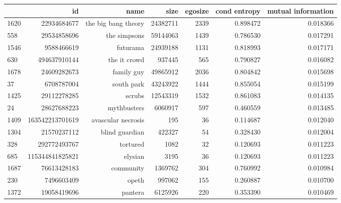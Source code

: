 \begin{table}
\begin{tabular}{| >{\small}l | >{\small}r | >{\small}r | >{\small}r | >{\small}r | >{\small}r |>{\small}r |}
\hline
{} &               id &                 name &      size &  egosize &  cond entropy &  mutual information \\
\hline
1620 &      22934684677 &  the big bang theory &  24382711 &     2339 &             0.898472 &            0.018366 \\
558  &      29534858696 &         the simpsons &  59144063 &     1439 &             0.786530 &            0.017291 \\
1546 &       9588466619 &             futurama &  24939188 &     1131 &             0.818993 &            0.017171 \\
630  &     494637910144 &         the it crowd &    937445 &      565 &             0.790827 &            0.016082 \\
1678 &      24609282673 &           family guy &  49865912 &     2036 &             0.804842 &            0.015698 \\
37   &       6708787004 &           south park &  43243922 &     1444 &             0.855054 &            0.015199 \\
1425 &      29112278285 &               scrubs &  12543319 &     1532 &             0.861083 &            0.014135 \\
24   &      28627688223 &          mythbusters &   6060917 &      597 &             0.460559 &            0.013485 \\
1409 &  163542213701619 &   avascular necrosis &       195 &       36 &             0.114687 &            0.012040 \\
1304 &      21570237112 &       blind guardian &    422327 &       54 &             0.328430 &            0.012004 \\
328  &     292772493767 &             tortured &      1082 &       32 &             0.120693 &            0.011223 \\
685  &  115344841825821 &              elysian &      3195 &       36 &             0.120693 &            0.011223 \\
1687 &      76613428183 &            community &   1369762 &      304 &             0.760992 &            0.010984 \\
230  &       7496603409 &                opeth &    997062 &      155 &             0.260887 &            0.010700 \\
1372 &      19058419696 &              pantera &   6125926 &      220 &             0.353390 &            0.010469 \\

\end{tabular}
\end{table}
